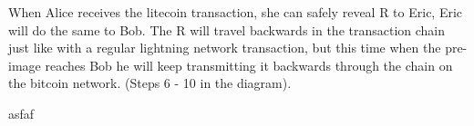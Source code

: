 When Alice receives the litecoin transaction, she can safely reveal R to Eric, Eric will do the same to Bob. The R will travel backwards in the transaction chain just like with a regular lightning network transaction, but this time when the pre-image reaches Bob he will keep transmitting it backwards through the chain on the bitcoin network. (Steps 6 - 10 in the diagram).

asfaf